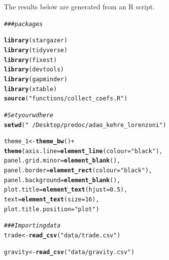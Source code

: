 \documentclass{article}\usepackage[]{graphicx}\usepackage[]{xcolor}
\makeatletter
\newcommand{\hlnum}[1]{\textcolor[rgb]{0.686,0.059,0.569}{#1}}%
\newcommand{\hlstr}[1]{\textcolor[rgb]{0.192,0.494,0.8}{#1}}%
\newcommand{\hlcom}[1]{\textcolor[rgb]{0.678,0.584,0.686}{\textit{#1}}}%
\newcommand{\hlopt}[1]{\textcolor[rgb]{0,0,0}{#1}}%
\newcommand{\hlstd}[1]{\textcolor[rgb]{0.345,0.345,0.345}{#1}}%
\newcommand{\hlkwb}[1]{\textcolor[rgb]{0.69,0.353,0.396}{#1}}%
\newcommand{\hlkwc}[1]{\textcolor[rgb]{0.333,0.667,0.333}{#1}}%
\newcommand{\hlkwd}[1]{\textcolor[rgb]{0.737,0.353,0.396}{\textbf{#1}}}%
\newenvironment{kframe}{%
 \def\at@end@of@kframe{}%
 \ifinner\ifhmode%
  \def\at@end@of@kframe{\end{minipage}}%
  \begin{minipage}{\columnwidth}%
 \fi\fi%
 \def\FrameCommand##1{\hskip\@totalleftmargin \hskip-\fboxsep
 \colorbox{shadecolor}{##1}\hskip-\fboxsep
     \hskip-\linewidth \hskip-\@totalleftmargin \hskip\columnwidth}%
 \MakeFramed {\advance\hsize-\width
   \@totalleftmargin\z@ \linewidth\hsize
   \@setminipage}}%
 {\par\unskip\endMakeFramed%
 \at@end@of@kframe}
\newenvironment{knitrout}{}{} %
\makeatother
\begin{document}
\title{}



\maketitle
The results below are generated from an R script.

\begin{knitrout}
\color{fgcolor}\begin{kframe}
\begin{alltt}
\hlcom{### packages}

\hlkwd{library}\hlstd{(stargazer)}
\hlkwd{library}\hlstd{(tidyverse)}
\hlkwd{library}\hlstd{(fixest)}
\hlkwd{library}\hlstd{(devtools)}
\hlkwd{library}\hlstd{(gapminder)}
\hlkwd{library}\hlstd{(xtable)}
\hlkwd{source}\hlstd{(}\hlstr{"functions/collect_coefs.R"}\hlstd{)}

\hlcom{# Set your wd here}
\hlkwd{setwd}\hlstd{(}\hlstr{"~/Desktop/predoc/adao_kehre_lorenzoni"}\hlstd{)}

\hlstd{theme_1} \hlkwb{<-} \hlkwd{theme_bw}\hlstd{()} \hlopt{+}
  \hlkwd{theme}\hlstd{(}\hlkwc{axis.line} \hlstd{=} \hlkwd{element_line}\hlstd{(}\hlkwc{colour} \hlstd{=} \hlstr{"black"}\hlstd{),}
        \hlkwc{panel.grid.minor} \hlstd{=} \hlkwd{element_blank}\hlstd{(),}
        \hlkwc{panel.border} \hlstd{=} \hlkwd{element_rect}\hlstd{(}\hlkwc{colour} \hlstd{=} \hlstr{"black"}\hlstd{),}
        \hlkwc{panel.background} \hlstd{=} \hlkwd{element_blank}\hlstd{(),}
        \hlkwc{plot.title} \hlstd{=} \hlkwd{element_text}\hlstd{(}\hlkwc{hjust} \hlstd{=} \hlnum{0.5}\hlstd{),}
        \hlkwc{text} \hlstd{=} \hlkwd{element_text}\hlstd{(}\hlkwc{size} \hlstd{=} \hlnum{16}\hlstd{),}
        \hlkwc{plot.title.position} \hlstd{=} \hlstr{"plot"}\hlstd{)}

\hlcom{### Importing data}
\hlstd{trade} \hlkwb{<-} \hlkwd{read_csv}\hlstd{(}\hlstr{"data/trade.csv"}\hlstd{)}
\end{alltt}


{\ttfamily\noindent\itshape{}}\begin{alltt}
\hlstd{gravity} \hlkwb{<-} \hlkwd{read_csv}\hlstd{(}\hlstr{"data/gravity.csv"}\hlstd{)}
\end{alltt}



\end{kframe}
\end{knitrout}
\end{document}
